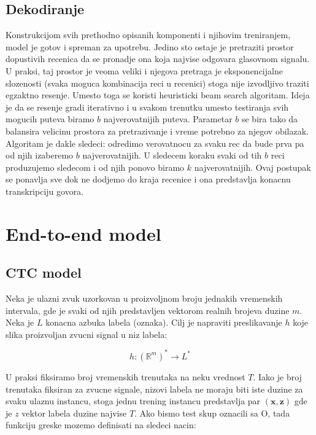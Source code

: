 \documentclass[a4paper]{article}
\begin{document}
\subsection{Dekodiranje}
Konstrukcijom svih prethodno opisanih komponenti i njihovim treniranjem, model je gotov i spreman za upotrebu.
Jedino sto ostaje je pretraziti prostor dopustivih recenica da se pronadje ona koja najvise odgovara glasovnom signalu.
U praksi, taj prostor je veoma veliki i njegova pretraga je eksponencijalne slozenosti (svaka moguca kombinacija reci u recenici) stoga nije izvodljivo traziti egzaktno resenje.
Umesto toga se koristi heuristicki beam search algoritam. Ideja je da se resenje gradi iterativno i u svakom trenutku umesto testiranja svih mogucih puteva biramo $b$ najverovatnijih puteva.
Parametar $b$ se bira tako da balansira velicinu prostora za pretrazivanje i vreme potrebno za njegov obilazak.
Algoritam je dakle sledeci: odredimo verovatnocu za svaku rec da bude prva pa od njih izaberemo $b$ najverovatnijih. U sledecem koraku svaki od tih $b$ reci produzujemo sledecom i od njih ponovo biramo $k$ najverovatnijih.
Ovaj postupak se ponavlja sve dok ne dodjemo do kraja recenice i ona predstavlja konacnu transkripciju govora.

\section{End-to-end model}


\subsection{CTC model}

Neka je ulazni zvuk uzorkovan u proizvoljnom broju jednakih vremenskih intervala,  gde je svaki od njih predstavljen vektorom realnih brojeva duzine $m$.  Neka je $L$ konacna azbuka labela (oznaka).  Cilj je napraviti preslikavanje $h$ koje slika proizvoljan zvucni signal u niz labela:

\begin{equation}
\label{eq:pres1}
h: (\mathbb{R}^m)^* \rightarrow L^* 
\end{equation}


U praksi fiksiramo broj vremenskih trenutaka na neku vrednost $T$.  Iako je broj trenutaka fiksiran za zvucne signale,  nizovi labela ne moraju biti iste duzine za svaku ulaznu instancu, stoga jednu trening instancu predstavlja par $(\textbf{x}, \textbf{z})$ gde je $z$ vektor labela duzine najvise $T$.  Ako bismo test skup oznacili sa O, tada funkciju greske mozemo definisati na sledeci nacin:
\end{document}
